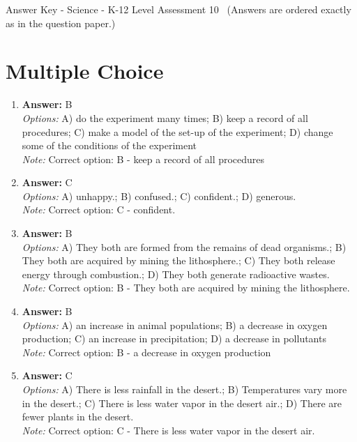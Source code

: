 \documentclass[12pt]{article}
\begin{document}
\begin{center}
Answer Key - Science - K-12 Level Assessment 10 \
\small (Answers are ordered exactly as in the question paper.)
\end{center}

\section*{Multiple Choice}
\begin{enumerate}[label=\arabic*.]
\item \textbf{Answer:} B
\\ \textit{Options:} A) do the experiment many times; B) keep a record of all procedures; C) make a model of the set-up of the experiment; D) change some of the conditions of the experiment
\\ \textit{Note:} Correct option: B - keep a record of all procedures
\item \textbf{Answer:} C
\\ \textit{Options:} A) unhappy.; B) confused.; C) confident.; D) generous.
\\ \textit{Note:} Correct option: C - confident.
\item \textbf{Answer:} B
\\ \textit{Options:} A) They both are formed from the remains of dead organisms.; B) They both are acquired by mining the lithosphere.; C) They both release energy through combustion.; D) They both generate radioactive wastes.
\\ \textit{Note:} Correct option: B - They both are acquired by mining the lithosphere.
\item \textbf{Answer:} B
\\ \textit{Options:} A) an increase in animal populations; B) a decrease in oxygen production; C) an increase in precipitation; D) a decrease in pollutants
\\ \textit{Note:} Correct option: B - a decrease in oxygen production
\item \textbf{Answer:} C
\\ \textit{Options:} A) There is less rainfall in the desert.; B) Temperatures vary more in the desert.; C) There is less water vapor in the desert air.; D) There are fewer plants in the desert.
\\ \textit{Note:} Correct option: C - There is less water vapor in the desert air.
\end{enumerate}
\end{document}
